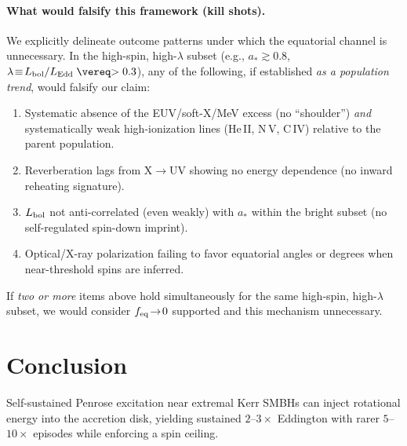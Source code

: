 \documentclass[twocolumn]{aastex701}
\begin{document}
\paragraph{What would falsify this framework (kill shots).}
We explicitly delineate outcome patterns under which the equatorial channel is unnecessary. In the high-spin, high-$\lambda$ subset (e.g., $a_*\gtrsim0.8$, $\lambda\!\equiv\!L_{\rm bol}/L_{\rm Edd}\gtrsim0.3$), any of the following, if established \emph{as a population trend}, would falsify our claim:
\begin{enumerate}
\item Systematic absence of the EUV/soft-X/MeV excess (no ``shoulder'') \emph{and} systematically weak high-ionization lines (He\,II, N\,V, C\,IV) relative to the parent population.
\item Reverberation lags from X$\rightarrow$UV showing no energy dependence (no inward reheating signature).
\item $L_{\rm bol}$ not anti-correlated (even weakly) with $a_*$ within the bright subset (no self-regulated spin-down imprint).
\item Optical/X-ray polarization failing to favor equatorial angles or degrees when near-threshold spins are inferred.
\end{enumerate}
If \emph{two or more} items above hold simultaneously for the same high-spin, high-$\lambda$ subset, we would consider $f_{\rm eq}\!\to\!0$ supported and this mechanism unnecessary.

\section{Conclusion}\label{sec:conclusion}
Self-sustained Penrose excitation near extremal Kerr SMBHs can inject rotational energy into the accretion disk, yielding sustained $2$--$3\times$ Eddington with rarer $5$--$10\times$ episodes while enforcing a spin ceiling.

\clearpage
\appendix
\end{document}
